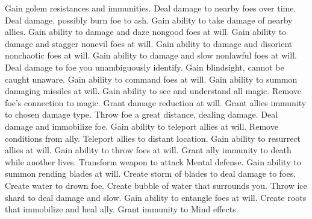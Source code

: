     {Gain golem resistances and immunities.}
    {Deal damage to nearby foes over time.}
    {Deal damage, possibly burn foe to ash.}
    {Gain ability to take damage of nearby allies.}
    {Gain ability to damage and daze nongood foes at will.}
    {Gain ability to damage and stagger nonevil foes at will.}
    {Gain ability to damage and disorient nonchaotic foes at will.}
    {Gain ability to damage and slow nonlawful foes at will.}
    {Deal damage to foe you unambiguously identify.}
    {Gain blindsight, cannot be caught unaware.}
    {Gain ability to command foes at will.}
    {Gain ability to summon damaging missiles at will.}
    {Gain ability to see and understand all magic.}
    {Remove foe's connection to magic.}
    {Grant damage reduction at will.}
    {Grant allies immunity to chosen damage type.}
    {Throw foe a great distance, dealing damage.}
    {Deal damage and immobilize foe.}
    {Gain ability to teleport allies at will.}
    {Remove conditions from ally.}
    {Teleport allies to distant location.}
    {Gain ability to resurrect allies at will.}
    {Gain ability to throw foes at will.}
    {Grant ally immunity to death while another lives.}
    {Transform weapon to attack Mental defense.}
    {Gain ability to summon rending blades at will.}
    {Create storm of blades to deal damage to foes.}
    {Create water to drown foe.}
    {Create bubble of water that surrounds you.}
    {Throw ice shard to deal damage and slow.}
    {Gain ability to entangle foes at will.}
    {Create roots that immobilize and heal ally.}
    {Grant immunity to Mind effects.}


